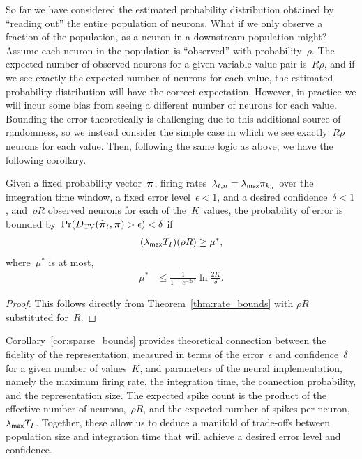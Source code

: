 
So far we have considered the estimated probability distribution
obtained by ``reading out'' the entire population of neurons. What if
we only observe a fraction of the population, as a neuron in a
downstream population might? Assume each neuron in the population is 
``observed'' with probability~$\rho$. The expected number of observed 
neurons for a given variable-value pair is~$R\rho$, and if we see 
exactly the expected number of neurons for each value, the estimated 
probability distribution will have the correct expectation. However, 
in practice we will incur some bias from seeing a different number of 
neurons for each value. Bounding the error theoretically is challenging 
due to this additional source of randomness, so we instead consider 
the simple case in which we see exactly~$R \rho$ neurons for each value.
Then, following the same logic as above, we have the following 
corollary.

\begin{corollary}
  \label{cor:sparse_bounds}
  Given a fixed probability vector~$\boldsymbol{\pi}$, firing
  rates~$\lambda_{t,n} = \lambda_{\mathsf{max}} \pi_{k_n}$ over the
  integration time window, a fixed error level~$\epsilon < 1$, and a
  desired confidence~$\delta < 1$, and~$\rho R$ observed neurons for
  each of the~$K$ values, the probability of error is bounded
  by~$\Pr({D_{\mathrm{TV}}}(\widehat{\boldsymbol{\pi}}_t, \boldsymbol{\pi}) > \epsilon) < \delta$ if
  \begin{align}
    (\lambda_{\mathsf{max}} T_I) (\rho R) \geq \mu^*,
  \end{align} 
  where~$\mu^*$ is at most,
  \begin{align}
    \mu^* &\leq \frac{1}{1-e^{-2\epsilon^2}} \ln \frac{2K}{\delta}.  
  \end{align}
\end{corollary}

\begin{proof}
  This follows directly from Theorem~\ref{thm:rate_bounds} with $\rho R$ substituted for~$R$.
\end{proof}

Corollary~\ref{cor:sparse_bounds} provides theoretical connection
between the fidelity of the representation, measured in terms of the
error~$\epsilon$ and confidence~$\delta$ for a given number of
values~$K$, and parameters of the neural implementation, namely the
maximum firing rate, the integration time, the connection probability,
and the representation size.  The expected spike count is the product
of the effective number of neurons,~$\rho R$, and the expected number
of spikes per neuron,~$\lambda_{\mathsf{max}} T_I$.  Together, these allow us to
deduce a manifold of trade-offs between population size and
integration time that will achieve a desired error level and
confidence. 


